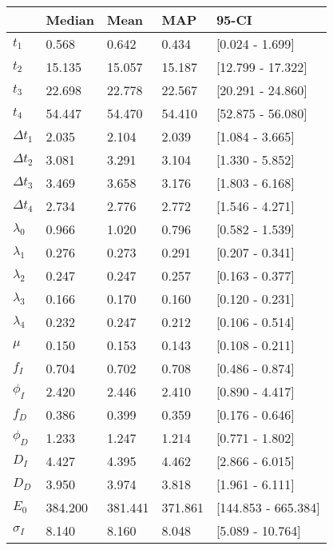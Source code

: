 \begin{tabular}{lllll}
\toprule
{} &   Median &     Mean &      MAP &                95-CI \\
\midrule
$t_1$        &    0.568 &    0.642 &    0.434 &      [0.024 - 1.699] \\
$t_2$        &   15.135 &   15.057 &   15.187 &    [12.799 - 17.322] \\
$t_3$        &   22.698 &   22.778 &   22.567 &    [20.291 - 24.860] \\
$t_4$        &   54.447 &   54.470 &   54.410 &    [52.875 - 56.080] \\
$\Delta t_1$ &    2.035 &    2.104 &    2.039 &      [1.084 - 3.665] \\
$\Delta t_2$ &    3.081 &    3.291 &    3.104 &      [1.330 - 5.852] \\
$\Delta t_3$ &    3.469 &    3.658 &    3.176 &      [1.803 - 6.168] \\
$\Delta t_4$ &    2.734 &    2.776 &    2.772 &      [1.546 - 4.271] \\
$\lambda_0$  &    0.966 &    1.020 &    0.796 &      [0.582 - 1.539] \\
$\lambda_1$  &    0.276 &    0.273 &    0.291 &      [0.207 - 0.341] \\
$\lambda_2$  &    0.247 &    0.247 &    0.257 &      [0.163 - 0.377] \\
$\lambda_3$  &    0.166 &    0.170 &    0.160 &      [0.120 - 0.231] \\
$\lambda_4$  &    0.232 &    0.247 &    0.212 &      [0.106 - 0.514] \\
$\mu$        &    0.150 &    0.153 &    0.143 &      [0.108 - 0.211] \\
$f_I$        &    0.704 &    0.702 &    0.708 &      [0.486 - 0.874] \\
$\phi_I$     &    2.420 &    2.446 &    2.410 &      [0.890 - 4.417] \\
$f_D$        &    0.386 &    0.399 &    0.359 &      [0.176 - 0.646] \\
$\phi_D$     &    1.233 &    1.247 &    1.214 &      [0.771 - 1.802] \\
$D_I$        &    4.427 &    4.395 &    4.462 &      [2.866 - 6.015] \\
$D_D$        &    3.950 &    3.974 &    3.818 &      [1.961 - 6.111] \\
$E_0$        &  384.200 &  381.441 &  371.861 &  [144.853 - 665.384] \\
$\sigma_I$   &    8.140 &    8.160 &    8.048 &     [5.089 - 10.764] \\

\end{tabular}
